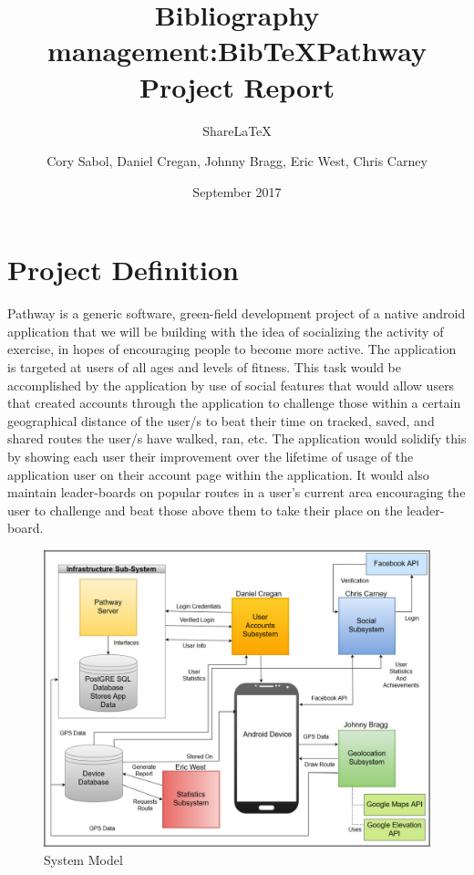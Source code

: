 \documentclass{article}
\title{Bibliography management:BibTeX}
\author{Share\LaTeX}
\title{Pathway Project Report}
\author{Cory Sabol, Daniel Cregan, Johnny Bragg, Eric West, Chris Carney}
\date{September 2017}
\begin{document}
\maketitle

\pagebreak

\tableofcontents

\pagebreak

\section{Project Definition}
Pathway is a generic software, green-field development project of a native android application that we will be building with the idea of socializing the activity of exercise, in hopes of encouraging people to become more active. The application is targeted at users of all ages and levels of fitness. This task would be accomplished by the application by use of social features that would allow users that created accounts through the application to challenge those within a certain geographical distance of the user/s to beat their time on tracked, saved, and shared routes the user/s have walked, ran, etc. The application would solidify this by showing each user their improvement over the lifetime of usage of the application user on their account page within the application. It would also maintain leader-boards on popular routes in a user's current area encouraging the user to challenge and beat those above them to take their place on the leader-board.
\begin{figure}[!htb]
    \centering
    \includegraphics[width=\textwidth]{system_model.jpg}
    \caption{System Model}
    \label{fig:my_label}
\end{figure}
\end{document}
